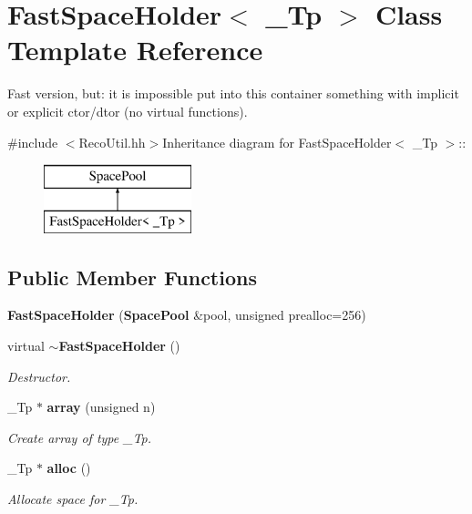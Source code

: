 \section{FastSpaceHolder$<$ \_\-Tp $>$ Class Template Reference}
\label{classFastSpaceHolder}


Fast version, but: it is impossible put into this container something with implicit or explicit ctor/dtor (no virtual functions).  


{\ttfamily \#include $<$RecoUtil.hh$>$}Inheritance diagram for FastSpaceHolder$<$ \_\-Tp $>$::\begin{figure}[H]
\begin{center}
\leavevmode
\includegraphics[height=2cm]{classFastSpaceHolder}
\end{center}
\end{figure}
\subsection*{Public Member Functions}
\begin{DoxyCompactItemize}
\item 
{\bfseries FastSpaceHolder} ({\bf SpacePool} \&pool, unsigned prealloc=256)\label{classFastSpaceHolder_a167f87252ec3e7efe1733d7471f873af}

\item 
virtual {\bf $\sim$FastSpaceHolder} ()\label{classFastSpaceHolder_a9159af3587150c073efbdf9767675eae}

\begin{DoxyCompactList}\small\item\em Destructor. \item\end{DoxyCompactList}\item 
\_\-Tp $\ast$ {\bf array} (unsigned n)
\begin{DoxyCompactList}\small\item\em Create array of type \_\-Tp. \item\end{DoxyCompactList}\item 
\_\-Tp $\ast$ {\bf alloc} ()\label{classFastSpaceHolder_a0ad44bb4cc8378a4f5596c523ea1c8a9}

\begin{DoxyCompactList}\small\item\em Allocate space for \_\-Tp. \item\end{DoxyCompactList}\end{DoxyCompactItemize}
